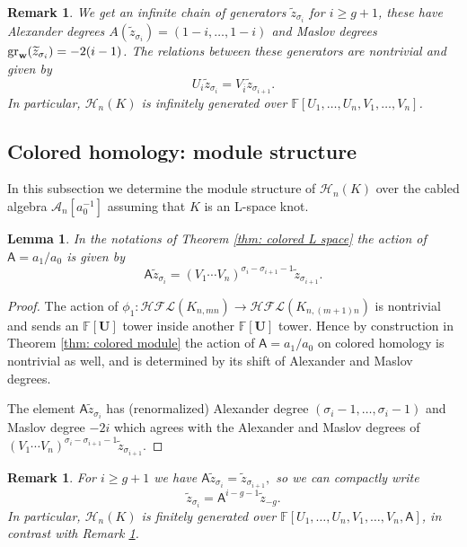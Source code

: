 \documentclass{amsart}
\newtheorem{lemma}[theorem]{Lemma}
\newtheorem{remark}[theorem]{Remark}
\newcommand{\CA}{\mathcal{A}}
\newcommand{\CH}{\mathcal{H}}
\newcommand{\F}{\mathbb{F}}
\newcommand{\cHFL}{\mathcal{H\!F\! L}}
\newcommand{\w}{\mathbf{w}}
\def\gr{\textup{gr}}
\def\w{{\bf{w}}}
\newcommand{\UU}{\mathbf{U}}
\newcommand{\EG}[1]{{\color{red}#1}}
\newcommand{\AAA}{\mathsf{A}}
\begin{document}
\begin{remark}
\label{rmk: infinitely generated}
We get an infinite chain of generators $\widetilde{z}_{\sigma_i}$ for $i\ge g+1$, these have Alexander degrees $A(\widetilde{z}_{\sigma_i})=(1-i,\ldots,1-i)$ and Maslov degrees $\gr_{\w}(\widetilde{z}_{\sigma_i})=-2(i-1)$.  The relations between these generators are nontrivial and given by
$$
U_i\widetilde{z}_{\sigma_i}=V_{\overline{i}}\widetilde{z}_{\sigma_{i+1}}.
$$
In particular, $\CH_{n}(K)$ is infinitely generated over $\F[U_1,\ldots,U_n,V_1,\ldots,V_n]$.
\end{remark}


\subsection{Colored homology: module structure}

In this subsection we determine the module structure of $\CH_{n}(K)$ over the cabled algebra $\CA_n[a_0^{-1}]$ assuming that $K$ is an L-space knot. 


\begin{lemma}
\label{lem: A action}
In the notations of Theorem \ref{thm: colored L space} the action of $\AAA=a_1/a_0$ is given by
$$
\AAA\widetilde{z}_{\sigma_i}=(V_1\cdots V_n)^{\sigma_i-\sigma_{i+1}-1}\widetilde{z}_{\sigma_{i+1}}.
$$
\end{lemma}

\begin{proof}
The action of $\phi_1:\cHFL(K_{n,mn})\to \cHFL(K_{n,(m+1)n})$ is nontrivial and sends an $\F[\UU]$ tower inside another $\F[\UU]$ tower. Hence by construction in Theorem \ref{thm: colored module} the action of $\AAA=a_1/a_0$ on colored homology is nontrivial as well, and is determined by its shift of Alexander and Maslov degrees.

The element $\AAA\widetilde{z}_{\sigma_i}$  has (renormalized) Alexander degree $(\sigma_i-1,\ldots,\sigma_i-1)$ and Maslov degree $-2i$ which agrees with the Alexander and Maslov degrees of 
$(V_1\cdots V_n)^{\sigma_i-\sigma_{i+1}-1}\widetilde{z}_{\sigma_{i+1}}.$
\end{proof}

\begin{remark}
For $i\ge g+1$ we have 
$
\AAA\widetilde{z}_{\sigma_i}=\widetilde{z}_{\sigma_{i+1}},
$
so we can compactly write $$\widetilde{z}_{\sigma_i}=\AAA^{i-g-1}\widetilde{z}_{-g}.$$
In particular, $\CH_{n}(K)$ is finitely generated over $\F[U_1,\ldots,U_n,V_1,\ldots,V_n,\AAA]$, in contrast with Remark \ref{rmk: infinitely generated}.
\end{remark}
\end{document}
